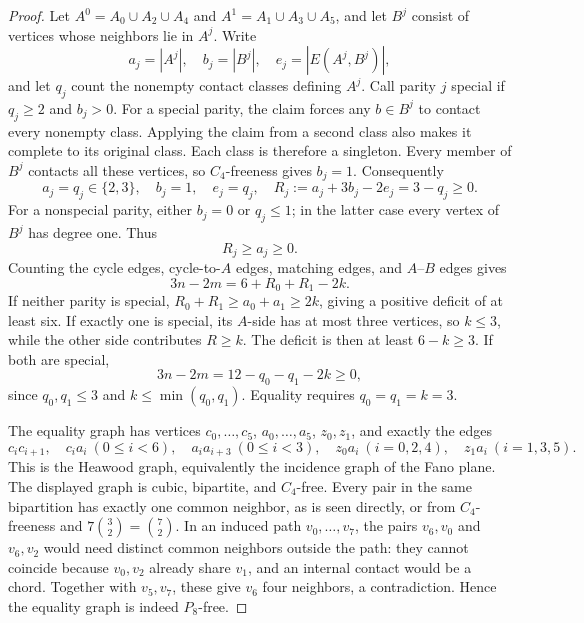 \documentclass[11pt,a4paper]{article}
\theoremstyle{definition}\newtheorem{definition}[theorem]{Definition}
\theoremstyle{remark}\newtheorem{remark}[theorem]{Remark}
\begin{document}
\begin{proof}
Let $A^0=A_0\cup A_2\cup A_4$ and $A^1=A_1\cup A_3\cup A_5$,
and let $B^j$ consist of vertices whose neighbors lie in $A^j$. Write
\[
 a_j=|A^j|,\quad b_j=|B^j|,\quad e_j=|E(A^j,B^j)|,
\]
and let $q_j$ count the nonempty contact classes defining $A^j$.
Call parity $j$ special if $q_j\ge2$ and $b_j>0$. For a special parity,
the claim forces any $b\in B^j$ to contact every nonempty class. Applying
the claim from a second class also makes it complete to its original
class. Each class is therefore a singleton. Every member of $B^j$ contacts
all these vertices, so $C_4$-freeness gives $b_j=1$. Consequently
\begin{equation}\label{local9:eq:special}
 a_j=q_j\in\{2,3\},\quad b_j=1,\quad e_j=q_j,
 \quad R_j:=a_j+3b_j-2e_j=3-q_j\ge0.
\end{equation}
For a nonspecial parity, either $b_j=0$ or $q_j\le1$; in the latter case
every vertex of $B^j$ has degree one. Thus
\begin{equation}\label{local9:eq:nonspecial}
 R_j\ge a_j\ge0.
\end{equation}
Counting the cycle edges, cycle-to-$A$ edges, matching edges, and
$A$--$B$ edges gives
\begin{equation}\label{local9:eq:bipcount}
 3n-2m=6+R_0+R_1-2k.
\end{equation}
If neither parity is special, $R_0+R_1\ge a_0+a_1\ge2k$, giving a
positive deficit of at least six. If exactly one is special, its $A$-side
has at most three vertices, so $k\le3$, while the other side contributes
$R\ge k$. The deficit is then at least $6-k\ge3$. If both are special,
\[
 3n-2m=12-q_0-q_1-2k\ge0,
\]
since $q_0,q_1\le3$ and $k\le\min(q_0,q_1)$. Equality requires
$q_0=q_1=k=3$.

The equality graph has vertices $c_0,\ldots,c_5$, $a_0,\ldots,a_5$,
$z_0,z_1$, and exactly the edges
\[
 c_ic_{i+1},\quad c_ia_i\ (0\le i<6),\quad
 a_ia_{i+3}\ (0\le i<3),\quad
 z_0a_i\ (i=0,2,4),\quad z_1a_i\ (i=1,3,5).
\]
This is the Heawood graph, equivalently the incidence graph of the Fano
plane. The displayed graph is cubic, bipartite, and $C_4$-free. Every
pair in the same bipartition has exactly one common neighbor, as is seen
directly, or from $C_4$-freeness and
$7\binom32=\binom72$. In an induced path $v_0,\ldots,v_7$, the pairs
$v_6,v_0$ and $v_6,v_2$ would need distinct common neighbors outside the
path: they cannot coincide because $v_0,v_2$ already share $v_1$, and an
internal contact would be a chord. Together with $v_5,v_7$, these give
$v_6$ four neighbors, a contradiction. Hence the equality graph is indeed
$P_8$-free.
\end{proof}
\end{document}
